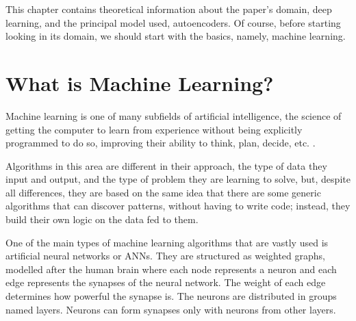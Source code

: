 This chapter contains theoretical information about the paper's domain, deep learning, and the principal model used, autoencoders.
Of course, before starting looking in its domain, we should start with the basics, namely, machine learning.
\section{What is Machine Learning?}

Machine learning is one of many subfields of artificial intelligence, the science of getting the computer to learn from experience
without being explicitly programmed to do so, improving their ability to think, plan, decide, etc. \cite{whatIsML}.
\vspace{0.5cm}

Algorithms in this area are different in their approach, the type of data they input and output, and the type of problem they are learning to
solve, but, despite all differences, they are based on the same idea that there are some generic algorithms that can discover patterns,
without having to write code; instead, they build their own logic on the data fed to them.
\vspace{0.5cm}

One of the main types of machine learning algorithms that are vastly used is artificial neural networks or ANNs.
They are structured as weighted graphs, modelled after the human brain where each node represents a neuron and each
edge represents the synapses of the neural network. The weight of each edge determines how powerful the synapse is.
The neurons are distributed in groups named layers. Neurons can form synapses only with neurons from other layers.
\vspace{0.5cm}

